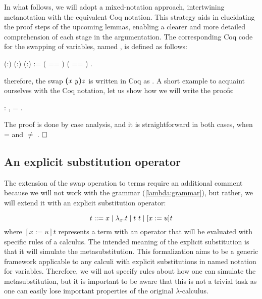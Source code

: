 In what follows, we will adopt a mixed-notation approach, intertwining metanotation with the equivalent Coq notation. This strategy aids in elucidating the proof steps of the upcoming lemmas, enabling a clearer and more detailed comprehension of each stage in the argumentation. The corresponding Coq code for the swapping of variables, named , is defined as follows: 
\begin{coqdoccode}
\coqdocemptyline
\coqdocnoindent
{}  (:) (:) (:) :=  ( == )     ( == )    .\coqdoceol
\coqdocemptyline
\end{coqdoccode}
\noindent therefore, the swap $\vswap{x}{y}{z}$ is written in Coq as    . A short example to acquaint ourselves with the Coq notation, let us show how we will write the proofs:
\begin{coqdoccode}
\coqdocemptyline
\coqdocnoindent
{} : \coqdockw{\ensuremath{\forall}}  ,     = .\coqdoceol
\end{coqdoccode}
 The proof is done by case analysis, and it is straightforward in both cases, when  =  and  \ensuremath{\not=} . $\hfill\Box$ 
\begin{coqdoccode}
\coqdocemptyline
\end{coqdoccode}
\subsection{An explicit substitution operator}



 The extension of the swap operation to terms require an additional comment because we will not work with the grammar (\ref{lambda:grammar}), but rather, we will extend it with an explicit substitution operator:


\begin{equation}\label{es:grammar}
  t ::= x \mid \lambda_x.t \mid t\ t \mid \esub{t}{x}{u}
\end{equation}
\noindent where $[x := u] t$ represents a term with an operator that will be evaluated with specific rules of a calculus. The intended meaning of the explicit substitution is that it will simulate the metasubstitution. This formalization aims to be a generic framework applicable to any calculi with explicit substitutions in named notation for variables. Therefore, we will not specify rules about how one can simulate the metasubstitution, but it is important to be aware that this is not a trivial task as one can easily lose important properties of the original $\lambda$-calculus\cite{melliesTypedLcalculiExplicit1995,guillaumeLambdaCalculusDoes2000}.


